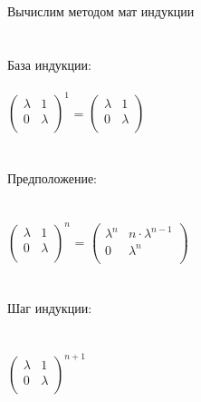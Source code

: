 \documentclass[12pt, a4paper]{article}
\begin{document}
	Вычислим методом мат индукции
	\\
	\\
	\\
	База индукции:\\
	\\
	\begin{math}
		\left(
		\begin{array}{rr}
			\lambda  & 1 \\
			0 & \lambda\\
		\end{array}
		\right ) ^1
	\end{math}
	= 
	\begin{math}
		\left(
		\begin{array}{rr}
			\lambda  & 1 \\
			0 & \lambda\\
		\end{array}
		\right )
	\end{math}
	\\\\\\
	Предположение:
	\\\\\\
	\begin{math}
		\left(
		\begin{array}{rr}
			\lambda  & 1 \\
			0 & \lambda\\
		\end{array}
		\right ) ^n
	\end{math}
	=
	\begin{math}
		\left(
		\begin{array}{rr}
			\lambda^n  & n\cdot \lambda^{n - 1} \\
			0 & \lambda^n\\
		\end{array}
		\right ) 
	\end{math}
	\\\\\\
	Шаг индукции:
	\\\\\\
	\begin{math}
		\left(
		\begin{array}{rr}
			\lambda  & 1 \\
			0 & \lambda\\
		\end{array}
		\right ) ^{n + 1}
	\end{math}
\end{document}
